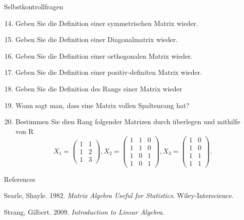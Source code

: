 \documentclass[
  8pt,
  ignorenonframetext,
]{beamer}
\newlength{\cslhangindent}
\newlength{\cslentryspacingunit} %
\newenvironment{CSLReferences}[2] %
 {%
  \setlength{\parindent}{0pt}
  \ifodd #1
  \let\oldpar\par
  \def\par{\hangindent=\cslhangindent\oldpar}
  \fi
  \setlength{\parskip}{#2\cslentryspacingunit}
 }%
 {}
\begin{document}
\begin{frame}{Selbstkontrollfragen}
\protect\hypertarget{selbstkontrollfragen-2}{}
\footnotesize
{}
\begin{enumerate}
\setcounter{enumi}{13}
\item Geben Sie die Definition einer symmetrischen Matrix wieder.
\item Geben Sie die Definition einer Diagonalmatrix wieder.
\item Geben Sie die Definition einer orthogonalen Matrix wieder.
\item Geben Sie die Definition einer positiv-definiten Matrix wieder.
\item Geben Sie die Definition des Rangs einer Matrix wieder
\item Wann sagt man, dass eine Matrix vollen Spaltenrang hat?
\item Bestimmen Sie dien Rang folgender Matrizen durch überlegen und mithilfe von R
\begin{equation}
X_1 = \begin{pmatrix} 1 & 1 \\ 1 & 2 \\ 1 & 3\end{pmatrix},
X_2 = \begin{pmatrix} 1 & 1 & 0\\ 1 & 1 & 0 \\ 1 & 0 & 1 \\ 1 & 0 & 1\end{pmatrix},
X_3 = \begin{pmatrix} 1 & 0\\ 1 & 0 \\ 1 & 1 \\ 1 & 1\end{pmatrix}.
\end{equation}
\end{enumerate}
\end{frame}

\begin{frame}{References}
\protect\hypertarget{references}{}
\footnotesize

\hypertarget{refs}{}
\begin{CSLReferences}{1}{0}
\leavevmode{}%
Searle, Shayle. 1982. \emph{Matrix {Algebra Useful} for {Statistics}}.
{Wiley-Interscience}.

\leavevmode{}%
Strang, Gilbert. 2009. \emph{Introduction to {Linear Algebra}}.

\end{CSLReferences}
\end{frame}
\end{document}
